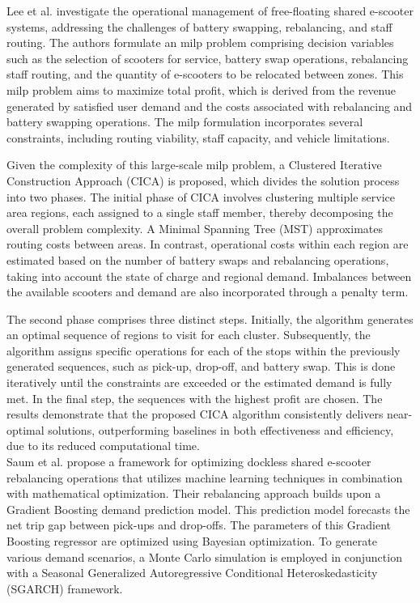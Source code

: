Lee et al. \cite{lee_battery_2024} investigate the operational management of free-floating shared e-scooter systems, addressing the challenges of battery swapping, rebalancing, and staff routing. 
The authors formulate an \gls{milp} problem comprising decision variables such as the selection of scooters for service, battery swap operations, rebalancing staff routing, and the quantity of e-scooters to be relocated between zones.
This \gls{milp} problem aims to maximize total profit, which is derived from the revenue generated by satisfied user demand and the costs associated with rebalancing and battery swapping operations.
The \gls{milp} formulation incorporates several constraints, including routing viability, staff capacity, and vehicle limitations. 

Given the complexity of this large-scale \gls{milp} problem, a Clustered Iterative Construction Approach (CICA) is proposed, which divides the solution process into two phases.
The initial phase of CICA involves clustering multiple service area regions, each assigned to a single staff member, thereby decomposing the overall problem complexity.
A Minimal Spanning Tree (MST) approximates routing costs between areas.
In contrast, operational costs within each region are estimated based on the number of battery swaps and rebalancing operations, taking into account the state of charge and regional demand.
Imbalances between the available scooters and demand are also incorporated through a penalty term.

The second phase comprises three distinct steps. 
Initially, the algorithm generates an optimal sequence of regions to visit for each cluster.
Subsequently, the algorithm assigns specific operations for each of the stops within the previously generated sequences, such as pick-up, drop-off, and battery swap. 
This is done iteratively until the constraints are exceeded or the estimated demand is fully met. 
In the final step, the sequences with the highest profit are chosen.
The results demonstrate that the proposed CICA algorithm consistently delivers near-optimal solutions, outperforming baselines in both effectiveness and efficiency, due to its reduced computational time.
\\

Saum et al. \cite{saum_optimizing_2024} propose a framework for optimizing dockless shared e-scooter rebalancing operations that utilizes machine learning techniques in combination with mathematical optimization. 
Their rebalancing approach builds upon a Gradient Boosting demand prediction model. 
This prediction model forecasts the net trip gap between pick-ups and drop-offs. 
The parameters of this Gradient Boosting regressor are optimized using Bayesian optimization. 
To generate various demand scenarios, a Monte Carlo simulation is employed in conjunction with a Seasonal Generalized Autoregressive Conditional Heteroskedasticity (SGARCH) framework. 

